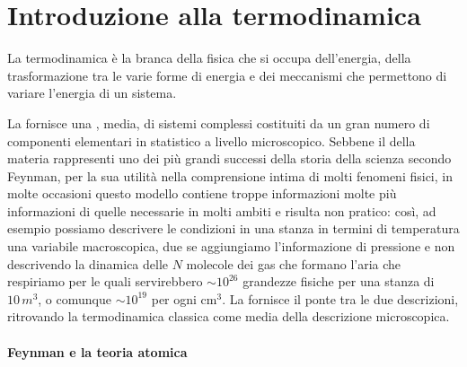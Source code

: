 \documentclass[letterpaper,10pt,italian]{jupyterBook}
\begin{document}
\sphinxstepscope


\chapter{Introduzione alla termodinamica}
\label{\detokenize{ch/thermodynamics/foundation:introduzione-alla-termodinamica}}\label{\detokenize{ch/thermodynamics/foundation:physics-hs-thermodynamics-intro}}\label{\detokenize{ch/thermodynamics/foundation::doc}}
\sphinxAtStartPar
La termodinamica è la branca della fisica che si occupa dell’energia, della trasformazione tra le varie forme di energia e dei meccanismi che permettono di variare l’energia di un sistema.

\sphinxAtStartPar
La  fornisce una , media, di sistemi complessi costituiti da un gran numero di componenti elementari in  statistico a livello microscopico. Sebbene il  della materia rappresenti uno dei più grandi successi della storia della scienza secondo Feynman, per la sua utilità nella comprensione intima di molti fenomeni fisici, in molte occasioni questo modello contiene troppe informazioni \sphinxhyphen{} molte più informazioni di quelle necessarie in molti ambiti \sphinxhyphen{} e risulta non pratico: così, ad esempio possiamo descrivere le condizioni in una stanza in termini di temperatura \sphinxhyphen{} una \sphinxstylestrong{(!)} variabile macroscopica, due se aggiungiamo l’informazione di pressione \sphinxhyphen{} e non descrivendo la dinamica delle \(N\) molecole dei gas che formano l’aria che respiriamo \sphinxhyphen{} per le quali servirebbero \(\sim 10^{26}\) grandezze fisiche per una stanza di \(10 \, m^3\), o comunque \(\sim 10^{19}\) per ogni \(\text{cm}^3\). La  fornisce il ponte tra le due descrizioni, ritrovando la termodinamica classica come media della descrizione microscopica.
\subsubsection*{Feynman e la teoria atomica}
\end{document}
